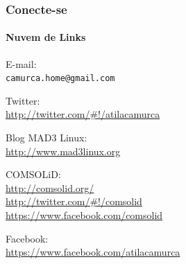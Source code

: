 \begin{frame}\frametitle{Conecte-se}\framesubtitle{Nuvem de Links}

\begin{center}
E-mail:\\
\texttt{camurca.home@gmail.com}

\medskip

Twitter:\\
\url{http://twitter.com/\#!/atilacamurca}

\medskip

Blog MAD3 Linux:\\
\url{http://www.mad3linux.org}

\medskip

COMSOLiD:\\
\url{http://comsolid.org/}\\
\url{http://twitter.com/\#!/comsolid}\\
\url{https://www.facebook.com/comsolid}

\medskip

Facebook:\\
\url{https://www.facebook.com/atilacamurca}
\end{center}


\end{frame}